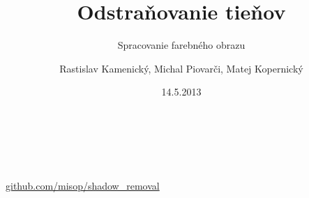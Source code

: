 \documentclass[red]{beamer}
\begin{document}
\large

\title{Odstraňovanie tieňov}
\subtitle{Spracovanie farebného obrazu}
\author{Rastislav Kamenický, Michal Piovarči, Matej Kopernický}
\date{14.5.2013}

{
\begin{frame}[plain,t]
\begin{center}
\color{white}
\vspace{2,5cm}
\huge\inserttitle\\
\vspace{0.9cm}
\Large\insertsubtitle\\
\vspace{1.75cm}
\color{black}
\large\insertauthor\\
\bigskip\bigskip
\href{http://www.github.com/misop/shadow_removal}{github.com/misop/shadow\_removal}
\end{center}
\end{frame}
}
\end{document}
